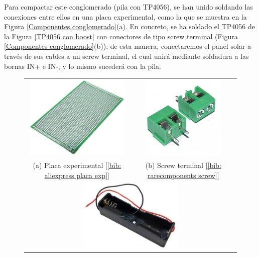 \documentclass[12pt]{article}
\begin{document}

	
	\noindent Para compactar este conglomerado (pila  con TP4056), se han unido soldando las conexiones entre ellos en una placa experimental, como la que se muestra en la Figura \ref{Componentes conglomerado}(a). En concreto, se ha soldado el TP4056 de la Figura \ref{TP4056 con boost} con conectores de tipo screw terminal (Figura \ref{Componentes conglomerado}(b)); de esta manera, conectaremos el panel solar a través de sus cables a un screw terminal, el cual unirá mediante soldadura a las bornas IN+ e IN-, y lo mismo sucederá con la pila.
	
	\pagebreak
	
	\begin{figure}[h!]
		\begin{center}
			\begin{tabular}{cc}
				\includegraphics[width=50mm]{img/placa_exp.png} \label{Ejemplo placa experimental} &   \includegraphics[width=40mm]{img/screw.jpg}  \label{Ejemplo screw} \\
				(a) Placa experimental [\ref{bib: aliexpress placa exp}] & (b) Screw terminal [\ref{bib: rarecomponents screw}] \\[6pt]
				\multicolumn{2}{c}{\includegraphics[width=50mm]{img/18650_holder.png} \label{Ejemplo holder 18650} }\\

\end{tabular}
\end{center}
\end{figure}
\end{document}
